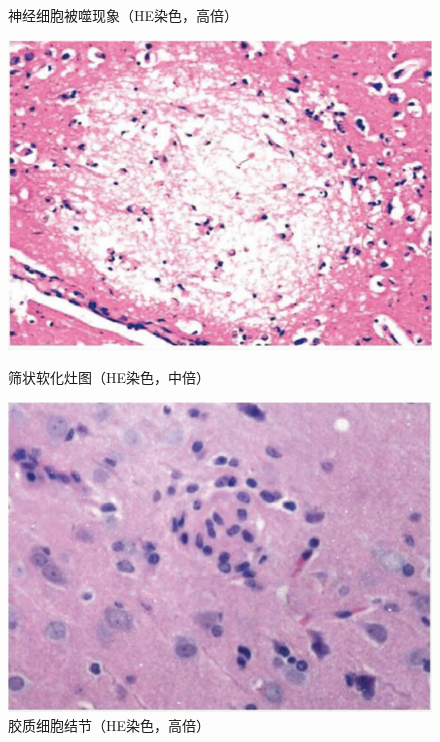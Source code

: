 \begin{figure}[!htbp]
\begin{minipage}[b]{0.45\textwidth}
 \caption{神经细胞被噬现象（HE染色，高倍）}
 \label{fig13-3}
    \end{minipage}
    \begin{minipage}[b]{0.45\textwidth}
		\includegraphics[height=.2\textheight]{./images/Image00220.jpg}
 \captionsetup{justification=centering}
 \caption{筛状软化灶图（HE染色，中倍）}
 \label{fig13-4}
	\end{minipage}
	\hspace{0.04\textwidth}%
	\begin{minipage}[b]{0.45\textwidth}
		\includegraphics[height=.2\textheight]{./images/Image00221.jpg}
 \captionsetup{justification=centering}
 \caption{胶质细胞结节（HE染色，高倍）}
 \label{fig13-5}
	\end{minipage}
\end{figure}

